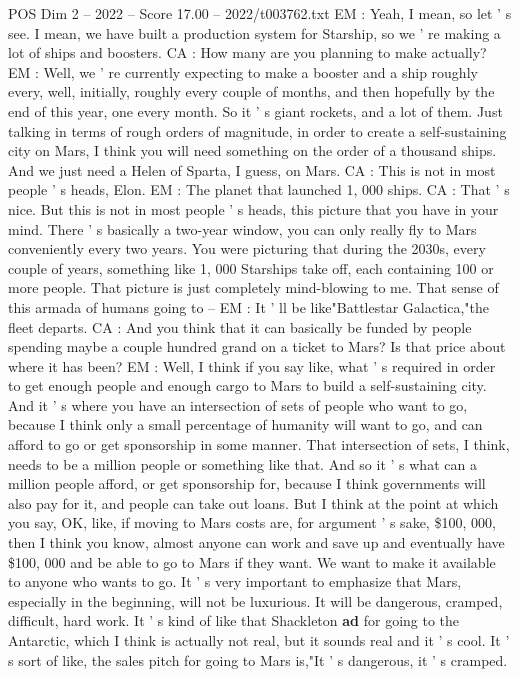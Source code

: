 \begin{textsample}{POS Dim 2 – 2022 – Score 17.00 – 2022/t003762.txt}
EM : Yeah, I mean, so let ' s see.
I mean, we have built a production system for Starship, so we ' re making a lot of ships and boosters.
CA : How many are you planning to make actually?
EM : Well, we ' re currently expecting to make a booster and a ship roughly every, well, initially, roughly every couple of months, and then hopefully by the end of this year, one every month.
So it ' s giant rockets, and a lot of them.
Just talking in terms of rough orders of magnitude, in order to create a self-sustaining city on Mars, I think you will need something on the order of a thousand ships.
And we just need a Helen of Sparta, I guess, on Mars.
CA : This is not in most people ' s heads, Elon.
EM : The planet that launched 1, 000 ships.
CA : That ' s nice.
But this is not in most people ' s heads, this picture that you have in your mind.
There ' s basically a two-year window, you can only really fly to Mars conveniently every two years.
You were picturing that during the 2030s, every couple of years, something like 1, 000 Starships take off, each containing 100 or more people.
That picture is just completely mind-blowing to me.
That sense of this armada of humans going to -- EM : It ' ll be like"Battlestar Galactica,"the fleet departs.
CA : And you think that it can basically be funded by people spending maybe a couple hundred grand on a ticket to Mars?
Is that price about where it has been?
EM : Well, I think if you say like, what ' s required in order to get enough people and enough cargo to Mars to build a self-sustaining city.
And it ' s where you have an intersection of sets of people who want to go, because I think only a small percentage of humanity will want to go, and can afford to go or get sponsorship in some manner.
That intersection of sets, I think, needs to be a million people or something like that.
And so it ' s what can a million people afford, or get sponsorship for, because I think governments will also pay for it, and people can take out loans.
But I think at the point at which you say, OK, like, if moving to Mars costs are, for argument ' s sake, \$100, 000, then I think you know, almost anyone can work and save up and eventually have \$100, 000 and be able to go to Mars if they want.
We want to make it available to anyone who wants to go.
It ' s very important to emphasize that Mars, especially in the beginning, will not be luxurious.
It will be dangerous, cramped, difficult, hard work.
It ' s kind of like that Shackleton \textbf{ad} for going to the Antarctic, which I think is actually not real, but it sounds real and it ' s cool.
It ' s sort of like, the sales pitch for going to Mars is,"It ' s dangerous, it ' s cramped.

\end{textsample}

